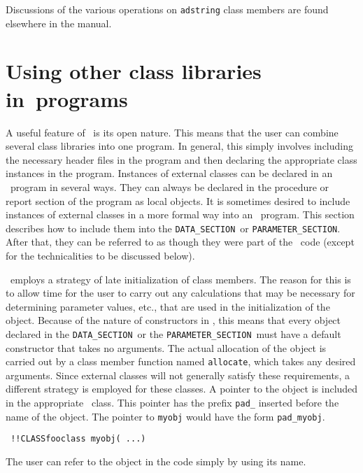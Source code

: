 \documentclass{admbmanual}
\newcommand\DS{\texttt{DATA\_SECTION}}
\newcommand\PS{\texttt{PARAMETER\_SECTION}}
\begin{document}
Discussions of the various operations on \texttt{adstring} class members are
found elsewhere in the manual.

\section{Using other class libraries in\br \ADM\ programs}

A useful feature of \cplus\ is its open nature. This means that the user can
combine several class libraries into one program. In general, this simply
involves including the necessary header files in the program and then declaring
the appropriate class instances in the program. Instances of external classes
can be declared in an \ADM\ program in several ways. They can always be declared
in the procedure or report section of the program as local objects. It is
sometimes desired to include instances of external classes in a more formal way
into an \ADM\ program. This section describes how to include them into the \DS\
or \PS. After that, they can be referred to as though they were part of the
\ADM\ code (except for the technicalities to be discussed below).

\ADM\ employs a strategy of late initialization of class members. The reason for
this is to allow time for the user to carry out any calculations that may be
necessary for determining parameter values, etc., that are used in the
initialization of the object. Because of the nature of constructors in \cplus,
this means that every object declared in the \DS\ or the \PS\ must have a
default constructor that takes no arguments. The actual allocation of the object
is carried out by a class member function named \texttt{allocate}, which takes
any desired arguments. Since external classes will not generally satisfy these
requirements, a different strategy is employed for these classes. A pointer to
the object is included in the appropriate \ADM\ class. This pointer has the
prefix \texttt{pad\_} inserted before the name of the object. The pointer to
\texttt{myobj} would have the form \texttt{pad\_myobj}.
\begin{lstlisting}
 !!CLASSfooclass myobj( ...)
\end{lstlisting}
The user can refer to the object in the code simply by using its name.

\end{document}
